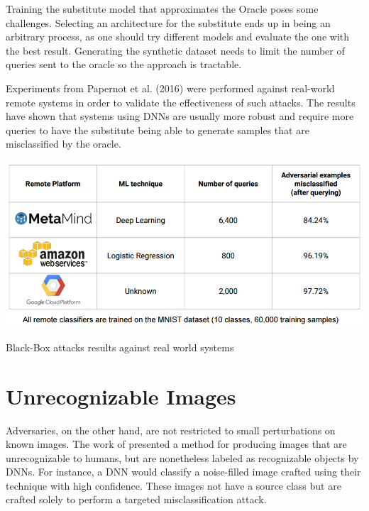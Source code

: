 Training the substitute model that approximates the Oracle poses some challenges. Selecting an architecture for the substitute ends up in being an arbitrary process, as one should try different models and evaluate the one with the best result. Generating the synthetic dataset needs to limit the number of queries sent to the oracle so the approach is tractable. 

Experiments from Papernot et al. (2016) were performed against real-world remote systems in order to validate the effectiveness of such attacks. The results have shown that systems using DNNs are usually more robust and require more queries to have the substitute being able to generate samples that are misclassified by the oracle.

\begin{table}[!h]
	\centering
	\includegraphics[scale=0.7]{black_box.png}
	\caption{Black-Box attacks results against real world systems}
	\label{tbl:black_box}
\end{table}

\section{Unrecognizable Images}\label{subsec:unrec}

Adversaries, on the other hand, are not restricted to small perturbations on known images. The work of \cite{nguyen2015} presented a method for producing images that are unrecognizable to humans, but are nonetheless labeled as recognizable objects by DNNs. For instance, a DNN would classify a noise-filled image crafted using their technique with high confidence. These images not have a source class but are crafted solely to perform a targeted misclassification attack.

